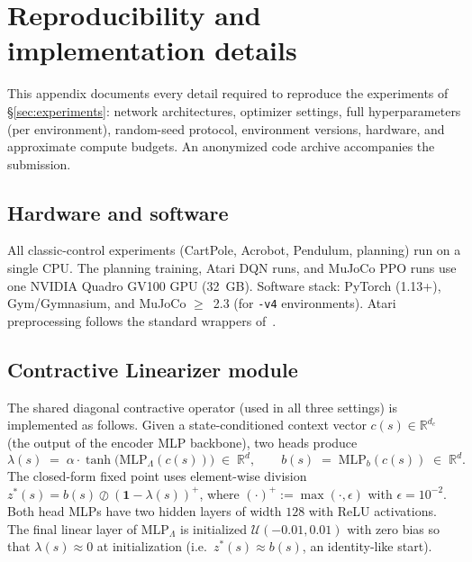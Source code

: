 \documentclass{article}
\newcommand{\R}{\mathbb{R}}
\newcommand{\zstar}{z^*}                     %
\newcommand{\spb}{\alpha}                    %
\newcommand{\eigs}{\lambda}                  %
\begin{document}




\newpage
\appendix

\section{Reproducibility and implementation details}
\label{app:repro}

This appendix documents every detail required to reproduce the experiments
of \S\ref{sec:experiments}: network architectures, optimizer settings, full
hyperparameters (per environment), random-seed protocol, environment versions,
hardware, and approximate compute budgets.
An anonymized code archive accompanies the submission.

\subsection{Hardware and software}
\label{app:hardware}
All classic-control experiments (CartPole, Acrobot, Pendulum, planning) run on
a single CPU.
The planning training, Atari DQN runs, and MuJoCo PPO runs use one NVIDIA
Quadro GV100 GPU (32~GB).
Software stack: PyTorch (1.13+), Gym/Gymnasium, and MuJoCo $\geq$~2.3
(for \texttt{-v4} environments).
Atari preprocessing follows the standard wrappers
of~\citet{mnih2015human}.

\subsection{Contractive Linearizer module}
\label{app:cl}
The shared diagonal contractive operator (used in all three settings) is
implemented as follows.
Given a state-conditioned context vector $c(s) \in \R^{d_c}$ (the output of
the encoder MLP backbone), two heads produce
\[
  \eigs(s) \;=\; \spb \cdot \tanh\!\bigl(\mathrm{MLP}_\Lambda(c(s))\bigr)
  \;\in\; \R^d,
  \qquad
  b(s) \;=\; \mathrm{MLP}_b(c(s)) \;\in\; \R^d.
\]
The closed-form fixed point uses element-wise division
$\zstar(s) = b(s) \oslash (\mathbf{1} - \eigs(s))^+$, where
$(\cdot)^+ := \max(\cdot, \epsilon)$ with $\epsilon = 10^{-2}$.
Both head MLPs have two hidden layers of width $128$ with ReLU activations.
The final linear layer of $\mathrm{MLP}_\Lambda$ is initialized
$\mathcal{U}(-0.01, 0.01)$ with zero bias so that $\eigs(s) \approx 0$ at
initialization (i.e.\ $\zstar(s) \approx b(s)$, an identity-like start).
\end{document}
